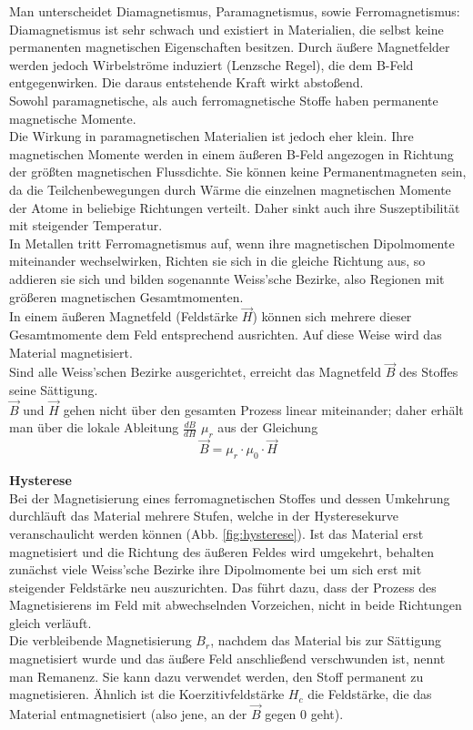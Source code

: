 \documentclass[12pt,a4paper]{article}
\begin{document}
\begin{multicols}{2}
Man unterscheidet Diamagnetismus, Paramagnetismus, sowie Ferromagnetismus:\\
Diamagnetismus ist sehr schwach und existiert in Materialien, die selbst keine permanenten magnetischen Eigenschaften besitzen. Durch äußere Magnetfelder werden jedoch Wirbelströme induziert (Lenzsche Regel), die dem B-Feld entgegenwirken. Die daraus entstehende Kraft wirkt abstoßend.\\

Sowohl paramagnetische, als auch ferromagnetische Stoffe haben permanente magnetische Momente.\\
Die Wirkung in paramagnetischen Materialien ist jedoch eher klein. Ihre magnetischen Momente werden in einem äußeren B-Feld angezogen in Richtung der größten magnetischen Flussdichte. Sie können keine Permanentmagneten sein, da die Teilchenbewegungen durch Wärme die einzelnen magnetischen Momente der Atome in beliebige Richtungen verteilt. Daher sinkt auch ihre Suszeptibilität mit steigender Temperatur.\\

In Metallen tritt Ferromagnetismus auf, wenn ihre magnetischen Dipolmomente miteinander wechselwirken, Richten sie sich in die gleiche Richtung aus, so addieren sie sich und bilden sogenannte Weiss'sche Bezirke, also Regionen mit größeren magnetischen Gesamtmomenten.\\
In einem äußeren Magnetfeld (Feldstärke $\vec H$) können sich mehrere dieser Gesamtmomente dem Feld entsprechend ausrichten. Auf diese Weise wird das Material magnetisiert.\\
Sind alle Weiss'schen Bezirke ausgerichtet, erreicht das Magnetfeld $\vec B$ des Stoffes seine Sättigung.\\
$\vec B$ und $\vec H$ gehen nicht über den gesamten Prozess linear miteinander; daher erhält man über die lokale Ableitung $\frac{dB}{dH}$ $\mu_r$ aus der Gleichung
$$\vec B = \mu_r \cdot \mu_0 \cdot \vec H$$



\noindent \textbf{Hysterese}\\
Bei der Magnetisierung eines ferromagnetischen Stoffes und dessen Umkehrung durchläuft das Material mehrere Stufen, welche in der Hysteresekurve veranschaulicht werden können (Abb. \ref{fig:hysterese}). Ist das Material erst magnetisiert und die Richtung des äußeren Feldes wird umgekehrt, behalten zunächst viele Weiss'sche Bezirke ihre Dipolmomente bei um sich erst mit steigender Feldstärke neu auszurichten. Das führt dazu, dass der Prozess des Magnetisierens im Feld mit abwechselnden Vorzeichen, nicht in beide Richtungen gleich verläuft.\\
Die verbleibende Magnetisierung $B_r$, nachdem das Material bis zur Sättigung magnetisiert wurde und das äußere Feld anschließend verschwunden ist, nennt man Remanenz. Sie kann dazu verwendet werden, den Stoff permanent zu magnetisieren. Ähnlich ist die Koerzitivfeldstärke $H_c$ die Feldstärke, die das Material entmagnetisiert (also jene, an der $\vec B$ gegen 0 geht).


\end{multicols}
\end{document}
